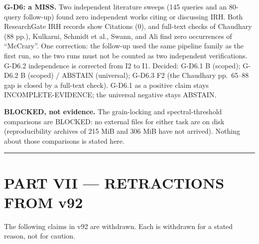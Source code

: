 \documentclass[a4paper,11pt]{article}
\begin{document}
\textbf{G-D6: a MISS.} Two independent literature sweeps (145 queries and an 80-query follow-up) found zero independent works citing or discussing IRH. Both ResearchGate IRH records show Citations (0), and full-text checks of Chaudhary (88 pp.), Kulkarni, Schmidt et al., Swann, and Ali find zero occurrences of ``McCrary''. One correction: the follow-up used the same pipeline family as the first run, so the two runs must not be counted as two independent verifications. G-D6.2 independence is corrected from I2 to I1. Decided: G-D6.1 B (scoped); G-D6.2 B (scoped) / ABSTAIN (universal); G-D6.3 F2 (the Chaudhary pp.\ 65--88 gap is closed by a full-text check). G-D6.1 as a positive claim stays INCOMPLETE-EVIDENCE; the universal negative stays ABSTAIN.

\textbf{BLOCKED, not evidence.} The grain-locking and spectral-threshold comparisons are BLOCKED: no external files for either task are on disk (reproducibility archives of 215 MiB and 306 MiB have not arrived). Nothing about those comparisons is stated here.

\medskip\hrule\medskip

\section*{PART VII — RETRACTIONS FROM v92}

The following claims in v92 are withdrawn. Each is withdrawn for a stated reason, not for caution.
\end{document}

